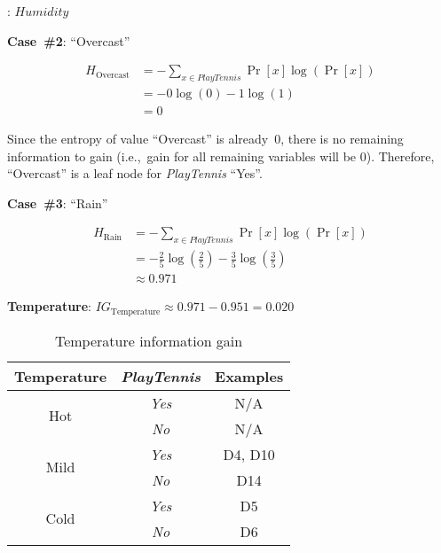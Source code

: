 \begin{center}
  \textbf{}: $\boxed{Humidity}$
\end{center}

\noindent
{\large \textbf{Case~\#2}: ``Overcast''}

\begin{align*}
  H_{\text{Overcast}} &= -\sum_{x\in PlayTennis} \Pr[x] \log \left(\Pr[x] \right)\\
                      &= - 0 \log(0) - 1 \log(1) \\
                      &= 0
\end{align*}

Since the entropy of value ``Overcast'' is already~0, there is no remaining information to gain (i.e.,~gain for all remaining variables will be 0).  Therefore, ``Overcast'' is a leaf node for \textit{PlayTennis} ``Yes''.

\noindent
{\large \textbf{Case~\#3}: ``Rain''}

\begin{align*}
  H_{\text{Rain}} &= -\sum_{x\in PlayTennis} \Pr[x] \log \left(\Pr[x]\right) \\
                  &= - \frac{2}{5} \log\left(\frac{2}{5}\right) - \frac{3}{5} \log\left(\frac{3}{5}\right) \\
                  &\approx 0.971
\end{align*}

\noindent
\textbf{Temperature}: $IG_{\text{Temperature}} \approx 0.971 - 0.951 = \boxed{0.020}$

  \begin{table}[h]
    \centering
    \caption{Temperature information gain}
    \begin{tabular}{c|c|c}
      \hline
      Temperature  & \textit{PlayTennis} & Examples \\\hline\hline
      \multirow{2}{*}{Hot}  & \textit{Yes} & N/A \\
                            & \textit{No}  & N/A \\\hline
      \multirow{2}{*}{Mild} & \textit{Yes} & D4, D10 \\
                            & \textit{No}  & D14 \\\hline
      \multirow{2}{*}{Cold} & \textit{Yes} & D5 \\
                            & \textit{No}  & D6 \\\hline
    \end{tabular}
  \end{table}

